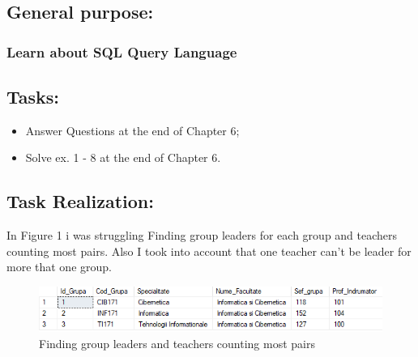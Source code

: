 \documentclass[12pt]{article}
\begin{document}
        \pagebreak
        \subsection*{ General purpose:}
        \subsubsection*{ Learn about SQL Query Language}
        
        \subsection*{Tasks:}
        \begin{itemize}
                \item Answer Questions at the end of Chapter 6;
                \item Solve ex. 1 - 8 at the end of Chapter 6.

                
        \end{itemize}
        \subsection*{Task Realization:}
        In Figure 1 i was struggling  Finding group leaders for each group and teachers counting most pairs. Also I took into account that one teacher can't be leader for more that one group.
        \begin{figure}[H]
                \centering
                \includegraphics[width=.9\textwidth]{img3.png}
                \caption{Finding group leaders and teachers counting most pairs}
        \end{figure}
        \vspace{0.5 cm}
        
\end{document}
